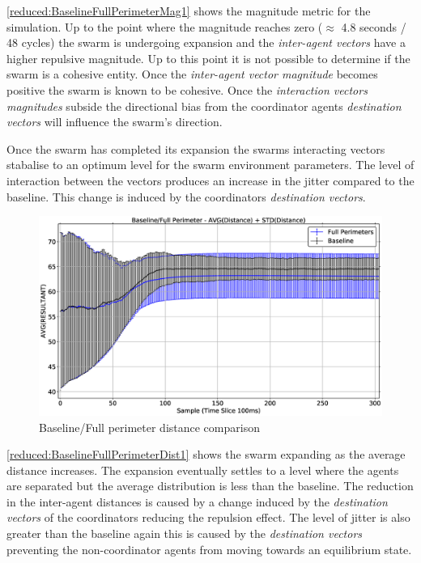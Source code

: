\autoref{reduced:BaselineFullPerimeterMag1} shows the magnitude metric for the simulation. Up to the point where the magnitude reaches zero ($\approx$ 4.8 seconds / 48 cycles) the swarm is undergoing expansion and the \textit{inter-agent vectors} have a higher repulsive magnitude. Up to this point it is not possible to determine if the swarm is a cohesive entity. Once the \textit{inter-agent vector magnitude} becomes positive the swarm is known to be cohesive. Once the \textit{interaction vectors magnitudes} subside the directional bias from the coordinator agents \textit{destination vectors} will influence the swarm's direction. 

Once the swarm has completed its expansion the swarms interacting vectors stabalise to an optimum level for the swarm environment parameters. The level of interaction between the vectors produces an increase in the jitter compared to the baseline. This change is induced by the coordinators \textit{destination vectors}.

\begin{figure}[H]
\begin{center}
\includegraphics[width=14cm]{CHAPTER-6/figures/BaselineFullPerimeterDist1}
\end{center}
\caption{Baseline/Full perimeter distance comparison\label{reduced:BaselineFullPerimeterDist1}}
\end{figure}

\autoref{reduced:BaselineFullPerimeterDist1} shows the swarm expanding as the average distance increases. The expansion eventually settles to a level where the agents are separated but the average distribution is less than the baseline. The reduction in the inter-agent distances is caused by a change induced by the \textit{destination vectors} of the coordinators reducing the repulsion effect. The level of jitter is also greater than the baseline again this is caused by the \textit{destination vectors} preventing the non-coordinator agents from moving towards an equilibrium state.

